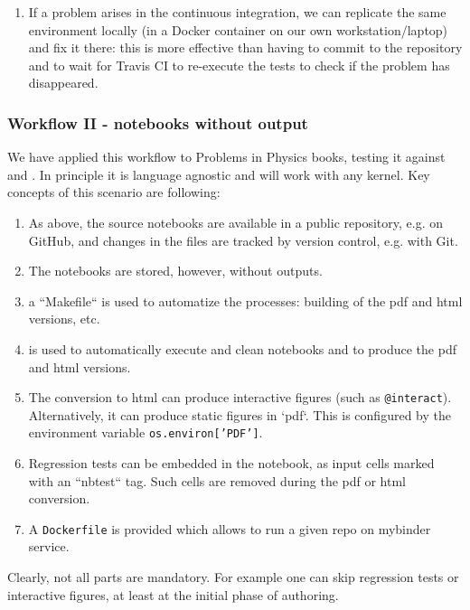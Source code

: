 \documentclass{deliverablereport}
\begin{document}
{{{\begin{itemize}
\begin{enumerate}
  \item If a problem arises in the continuous integration, we can
    replicate the same environment locally (in a Docker container on
    our own workstation/laptop) and fix it there: this is more
    effective than having to commit to the repository and to wait for
    Travis CI to re-execute the tests to check if the problem has
    disappeared.

  \end{enumerate}

\end{itemize}


\subsubsection{Workflow II - notebooks without output}

We have applied this workflow to Problems in Physics books, testing it
against \SageMath and \Python. In principle it is language agnostic
and will work with any \Jupyter kernel. Key concepts of this scenario
are following:

\begin{enumerate}
\item As above, the source notebooks are available in a public
  repository, e.g. on GitHub, and changes in the files are tracked
  by version control, e.g. with Git.
\item The notebooks are stored, however, without outputs.
\item a ``Makefile`` is used to automatize the processes: building of
  the pdf and html versions, etc.
\item \nbconvert is used to automatically execute and clean notebooks
  and to produce the pdf and html versions.
\item The conversion to html can produce interactive figures (such as
  \texttt{@interact}). Alternatively, it can produce static figures in
  `pdf`. This is configured by the environment variable
  \texttt{os.environ['PDF']}.
\item Regression tests can be embedded in the notebook, as input cells
  marked with an ``nbtest`` tag. Such cells are removed during the pdf
  or html conversion.
\item A \texttt{Dockerfile} is provided which allows to run a given
  repo on mybinder service.
\end{enumerate}

Clearly, not all parts are mandatory. For example one can skip
regression tests or interactive figures, at least at the initial phase
of authoring.

}}}
\end{document}
